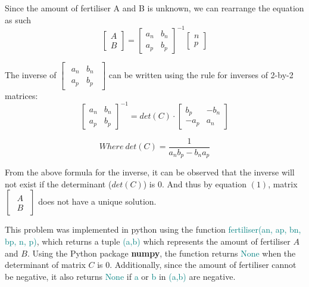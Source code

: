 \documentclass[a4paper]{article}
\newcommand \fertiliser {\textcolor{teal}{fertiliser(an, ap, bn, bp, n, p)}}
\begin{document}
\noindent
Since the amount of fertiliser A and B is unknown, we can rearrange the equation as such
\begin{equation}
    \begin{bmatrix} A \\ B \end{bmatrix} =
    \begin{bmatrix} a_n & b_n \\ a_p & b_p \end{bmatrix}^{-1}
    \begin{bmatrix} n \\p \end{bmatrix}
\end{equation}


\noindent
The inverse of $\begin{bmatrix}\begin{smallmatrix}a_n & b_n \\ a_p & b_p  \end{smallmatrix}\end{bmatrix}$ can be written using the rule for inverses of 2-by-2 matrices:
\begin{equation*}
    \begin{bmatrix} a_n & b_n \\ a_p & b_p \end{bmatrix}^{-1} =
    det(C)\cdot \begin{bmatrix} b_p & -b_n \\ -a_p & a_n \end{bmatrix}
\end{equation*}

\begin{flushright}
    \begin{equation*}
        Where \ det(C) = \frac{1}{a_n b_p - b_n a_p} 
    \end{equation*}
\end{flushright}

\noindent
From the above formula for the inverse, it can be observed that the inverse will not exist if the determinant ($det(C)$) is $0$. And thus by equation $(1)$, matrix $\begin{bmatrix}\begin{smallmatrix} A \\ B \end{smallmatrix}\end{bmatrix}$ does not have a unique solution. 
\vspace{2mm}

\noindent
This problem was implemented in python using the function \fertiliser, which returns a tuple \textcolor{teal}{(a,b)} which represents the amount of fertiliser $A$ and $B$. Using the Python package \textbf{numpy}, the function returns \textcolor{teal}{None} when the determinant of matrix $C$ is $0$. Additionally, since the amount of fertiliser cannot be negative, it also returns \textcolor{teal}{None} if \textcolor{teal}{a} or \textcolor{teal}{b} in \textcolor{teal}{(a,b)} are negative.

\nocite{CAB203_22se1}
\printbibliography
\end{document}
